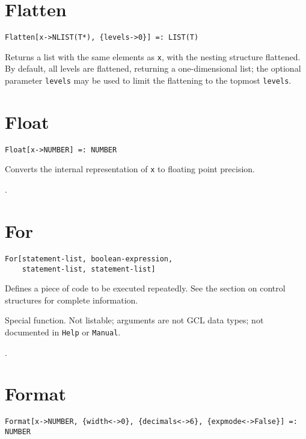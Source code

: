 \section*{Flatten}\label{PrimFlatten}
\begin{verbatim}
Flatten[x->NLIST(T*), {levels->0}] =: LIST(T) 
\end{verbatim}
\foralltypes

\noindent
Returns a list with the same elements as \verb+x+, with the nesting
structure flattened.  By default, all levels are flattened, returning
a one-dimensional list; the optional parameter \verb+levels+ may be
used to limit the flattening to the topmost \verb+levels+.


\section*{Float}\label{PrimFloat}
\begin{verbatim}
Float[x->NUMBER] =: NUMBER
\end{verbatim}

\noindent
Converts the internal representation of \verb+x+ to floating point
precision.

\seealso {}.


\section*{For}\label{PrimFor}
\begin{verbatim}
For[statement-list, boolean-expression, 
    statement-list, statement-list]
\end{verbatim}

\noindent
Defines a piece of code to be executed repeatedly.  See the section
on control structures for complete information.

\note Special function.  Not listable; arguments are not GCL
data types; not documented in \verb+Help+ or \verb+Manual+.  

\seealso {}.


\section*{Format}\label{PrimFormat}
\begin{verbatim}
Format[x->NUMBER, {width<->0}, {decimals<->6}, {expmode<->False}] =: NUMBER 
\end{verbatim}

